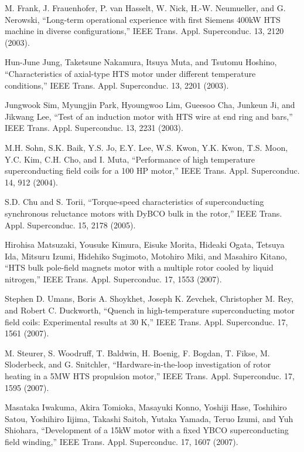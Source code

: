 \noindent [9.221] M. Frank, J. Frauenhofer, P. van Hasselt, W. Nick, H.-W. Neumueller, and G. Nerowski,
``Long-term operational experience with first Siemens 400kW HTS machine
in diverse configurations,” IEEE Trans. Appl. Superconduc. 13, 2120 (2003).

\noindent [9.222] Hun-June Jung, Taketsune Nakamura, Itsuya Muta, and Tsutomu Hoshino,
``Characteristics of axial-type HTS motor under different temperature conditions,”
IEEE Trans. Appl. Superconduc. 13, 2201 (2003).

\noindent [9.223] Jungwook Sim, Myungjin Park, Hyoungwoo Lim, Gueesoo Cha, Junkeun Ji, and
Jikwang Lee, ``Test of an induction motor with HTS wire at end ring and bars,”
IEEE Trans. Appl. Superconduc. 13, 2231 (2003).

\noindent [9.224] M.H. Sohn, S.K. Baik, Y.S. Jo, E.Y. Lee, W.S. Kwon, Y.K. Kwon, T.S. Moon, Y.C.
Kim, C.H. Cho, and I. Muta, ``Performance of high temperature superconducting
field coils for a 100 HP motor,” IEEE Trans. Appl. Superconduc. 14, 912 (2004).

\noindent [9.225] S.D. Chu and S. Torii, ``Torque-speed characteristics of superconducting synchronous
reluctance motors with DyBCO bulk in the rotor,” IEEE Trans. Appl.
Superconduc. 15, 2178 (2005).

\noindent [9.226] Hirohisa Matsuzaki, Yousuke Kimura, Eisuke Morita, Hideaki Ogata, Tetsuya Ida,
Mitsuru Izumi, Hidehiko Sugimoto, Motohiro Miki, and Masahiro Kitano, ``HTS
bulk pole-field magnets motor with a multiple rotor cooled by liquid nitrogen,”
IEEE Trans. Appl. Superconduc. 17, 1553 (2007).

\noindent [9.227] Stephen D. Umans, Boris A. Shoykhet, Joseph K. Zevchek, Christopher M. Rey,
and Robert C. Duckworth, ``Quench in high-temperature superconducting motor
field coils: Experimental results at 30 K,” IEEE Trans. Appl. Superconduc. 17,
1561 (2007).

\noindent [9.228] M. Steurer, S. Woodruff, T. Baldwin, H. Boenig, F. Bogdan, T. Fikse, M. Sloderbeck,
and G. Snitchler, ``Hardware-in-the-loop investigation of rotor heating in a
5MW HTS propulsion motor,” IEEE Trans. Appl. Superconduc. 17, 1595 (2007).

\noindent [9.229] Masataka Iwakuma, Akira Tomioka, Masayuki Konno, Yoshiji Hase, Toshihiro
Satou, Yoshihiro Iijima, Takashi Saitoh, Yutaka Yamada, Teruo Izumi, and Yuh
Shiohara, ``Development of a 15kW motor with a fixed YBCO superconducting
field winding,” IEEE Trans. Appl. Superconduc. 17, 1607 (2007).


